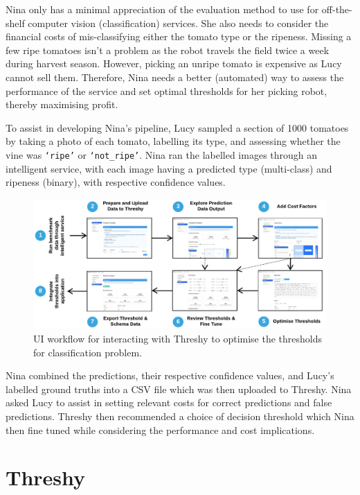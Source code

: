 Nina only has a minimal appreciation of the evaluation method to use for off-the-shelf computer vision (classification) services. She also needs to consider the financial costs of mis-classifying either the tomato type or the ripeness. Missing a few ripe tomatoes isn't a problem as the robot travels the field twice a week during harvest season. However, picking an unripe tomato is expensive as Lucy cannot sell them. Therefore, Nina needs a better (automated) way to assess the performance of the service and set optimal thresholds for her picking robot, thereby maximising profit.

To assist in developing Nina's pipeline, Lucy sampled a section of 1000 tomatoes by taking a photo of each tomato, labelling its type, and assessing whether the vine was  \texttt{`ripe'} or \texttt{`not\_ripe'}. Nina ran the labelled images through an intelligent service, with each image having a predicted type (multi-class) and ripeness (binary), with respective confidence values. 

\begin{figure}[t!]
    \centering
    \includegraphics[width=\linewidth]{workflow}
    \caption{UI workflow for interacting with Threshy to optimise the thresholds for classification problem.}
    \label{icse-demo2020:fig:workflow}
\end{figure}

Nina combined the predictions, their respective confidence values, and Lucy's labelled ground truths into a CSV file which was then uploaded to Threshy. Nina asked Lucy to assist in setting relevant costs for correct predictions and false predictions. Threshy then recommended a choice of decision threshold which Nina then fine tuned while considering the performance and cost implications. 

\section{Threshy}
\label{icse-demo2020:sec:threshy}


